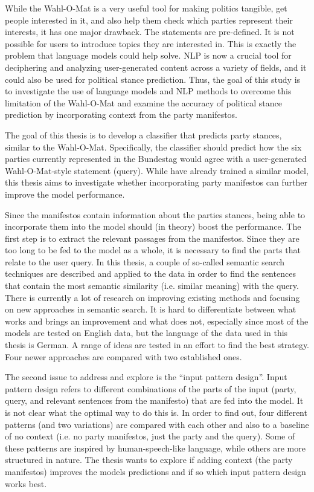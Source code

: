 While the Wahl-O-Mat \citep{wahlomat} is a very useful tool for making politics tangible, get people interested in it, and also help them check which parties represent their interests, it has one major drawback. The statements are pre-defined. It is not possible for users to introduce topics they are interested in. This is exactly the problem that language models could help solve. NLP is now a crucial tool for deciphering and analyzing user-generated content across a variety of fields, and it could also be used for political stance prediction. Thus, the goal of this study is to investigate the use of language models and NLP methods to overcome this limitation of the Wahl-O-Mat and examine the accuracy of political stance prediction by incorporating context from the party manifestos.

The goal of this thesis is to develop a classifier that predicts party stances, similar to the Wahl-O-Mat. Specifically, the classifier should predict how the six parties currently represented in the Bundestag would agree with a user-generated Wahl-O-Mat-style statement (query). While \citet{witte_2022} have already trained a similar model, this thesis aims to investigate whether incorporating party manifestos can further improve the model performance.

Since the manifestos contain information about the parties stances, being able to incorporate them into the model should (in theory) boost the performance. The first step is to extract the relevant passages from the manifestos. Since they are too long to be fed to the model as a whole, it is necessary to find the parts that relate to the user query. In this thesis, a couple of so-called semantic search techniques are described and applied to the data in order to find the sentences that contain the most semantic similarity (i.e. similar meaning) with the query. There is currently a lot of research on improving existing methods and focusing on new approaches in semantic search. It is hard to differentiate between what works and brings an improvement and what does not, especially since most of the models are tested on English data, but the language of the data used in this thesis is German. A range of ideas are tested in an effort to find the best strategy. Four newer approaches are compared with two established ones.

The second issue to address and explore is the ``input pattern design''. Input pattern design refers to different combinations of the parts of the input (party, query, and relevant sentences from the manifesto) that are fed into the model. It is not clear what the optimal way to do this is. In order to find out, four different patterns (and two variations) are compared with each other and also to a baseline of no context (i.e. no party manifestos, just the party and the query). Some of these patterns are inspired by human-speech-like language, while others are more structured in nature. The thesis wants to explore if adding context (the party manifestos) improves the models predictions and if so which input pattern design works best.

